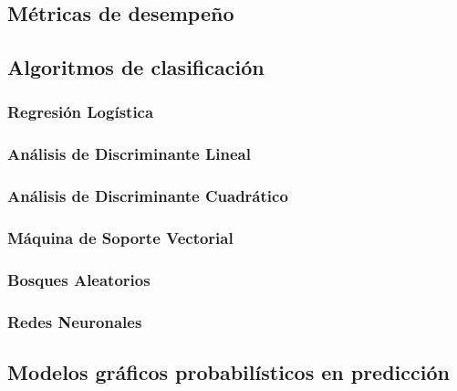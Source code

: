 \subsection{Métricas de desempeño} \label{MD}

\subsection{Algoritmos de clasificación} \label{AC}

\subsubsection{Regresión Logística} \label{RL}

\subsubsection{Análisis de Discriminante Lineal} \label{ADL}

\subsubsection{Análisis de Discriminante Cuadrático} \label{ADC}

\subsubsection{Máquina de Soporte Vectorial} \label{MSV}

\subsubsection{Bosques Aleatorios} \label{BA}

\subsubsection{Redes Neuronales} \label{RN}

\subsection{Modelos gráficos probabilísticos en predicción} \label{MGP}

